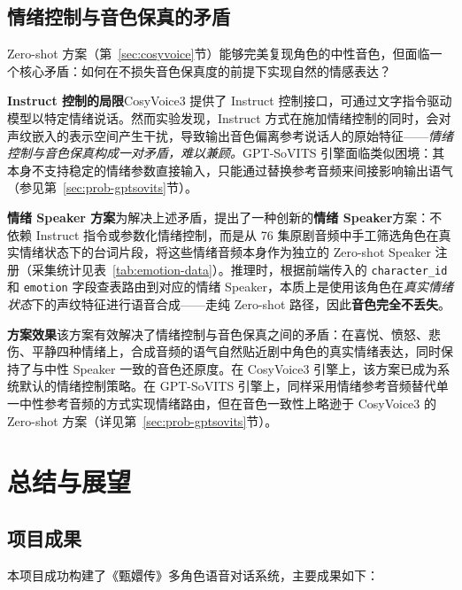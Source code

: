 \documentclass[12pt,a4paper]{article}
\begin{document}
\subsection{情绪控制与音色保真的矛盾}
\label{sec:prob-emotion}

Zero-shot 方案（第~\ref{sec:cosyvoice}节）能够完美复现角色的中性音色，但面临一个核心矛盾：如何在不损失音色保真度的前提下实现自然的情感表达？

\textbf{Instruct 控制的局限}\quad CosyVoice3 提供了 Instruct 控制接口，可通过文字指令驱动模型以特定情绪说话。然而实验发现，Instruct 方式在施加情绪控制的同时，会对声纹嵌入的表示空间产生干扰，导致输出音色偏离参考说话人的原始特征——\textit{情绪控制与音色保真构成一对矛盾，难以兼顾。}GPT-SoVITS 引擎面临类似困境：其本身不支持稳定的情绪参数直接输入，只能通过替换参考音频来间接影响输出语气（参见第~\ref{sec:prob-gptsovits}节）。

\textbf{情绪 Speaker 方案}\quad 为解决上述矛盾，提出了一种创新的\textbf{情绪 Speaker}方案：不依赖 Instruct 指令或参数化情绪控制，而是从 76 集原剧音频中手工筛选角色在真实情绪状态下的台词片段，将这些情绪音频本身作为独立的 Zero-shot Speaker 注册（采集统计见表~\ref{tab:emotion-data}）。推理时，根据前端传入的 \texttt{character\_id} 和 \texttt{emotion} 字段查表路由到对应的情绪 Speaker，本质上是使用该角色在\textit{真实情绪状态}下的声纹特征进行语音合成——走纯 Zero-shot 路径，因此\textbf{音色完全不丢失}。

\textbf{方案效果}\quad 该方案有效解决了情绪控制与音色保真之间的矛盾：在喜悦、愤怒、悲伤、平静四种情绪上，合成音频的语气自然贴近剧中角色的真实情绪表达，同时保持了与中性 Speaker 一致的音色还原度。在 CosyVoice3 引擎上，该方案已成为系统默认的情绪控制策略。在 GPT-SoVITS 引擎上，同样采用情绪参考音频替代单一中性参考音频的方式实现情绪路由，但在音色一致性上略逊于 CosyVoice3 的 Zero-shot 方案（详见第~\ref{sec:prob-gptsovits}节）。


\section{总结与展望}
\label{sec:conclusion}

\subsection{项目成果}

本项目成功构建了《甄嬛传》多角色语音对话系统，主要成果如下：
\end{document}
